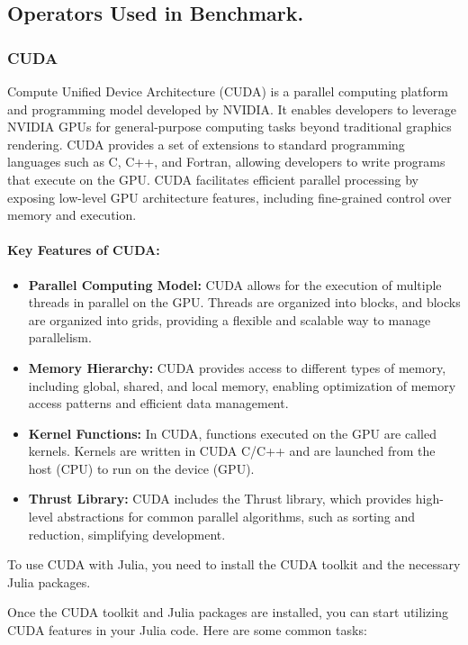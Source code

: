 \subsection{Operators Used in Benchmark.}
    \subsubsection{CUDA}
    Compute Unified Device Architecture (CUDA) is a parallel computing platform and programming model developed by NVIDIA. It enables developers to leverage NVIDIA GPUs for general-purpose computing tasks beyond traditional graphics rendering. CUDA provides a set of extensions to standard programming languages such as C, C++, and Fortran, allowing developers to write programs that execute on the GPU. CUDA facilitates efficient parallel processing by exposing low-level GPU architecture features, including fine-grained control over memory and execution.

    \paragraph{Key Features of CUDA:}
    \begin{itemize}
        \item \textbf{Parallel Computing Model:} CUDA allows for the execution of multiple threads in parallel on the GPU. Threads are organized into blocks, and blocks are organized into grids, providing a flexible and scalable way to manage parallelism.
        \item \textbf{Memory Hierarchy:} CUDA provides access to different types of memory, including global, shared, and local memory, enabling optimization of memory access patterns and efficient data management.
        \item \textbf{Kernel Functions:} In CUDA, functions executed on the GPU are called kernels. Kernels are written in CUDA C/C++ and are launched from the host (CPU) to run on the device (GPU).
        \item \textbf{Thrust Library:} CUDA includes the Thrust library, which provides high-level abstractions for common parallel algorithms, such as sorting and reduction, simplifying development.
    \end{itemize}

    To use CUDA with Julia, you need to install the CUDA toolkit and the necessary Julia packages. 
    
    Once the CUDA toolkit and Julia packages are installed, you can start utilizing CUDA features in your Julia code. Here are some common tasks:

